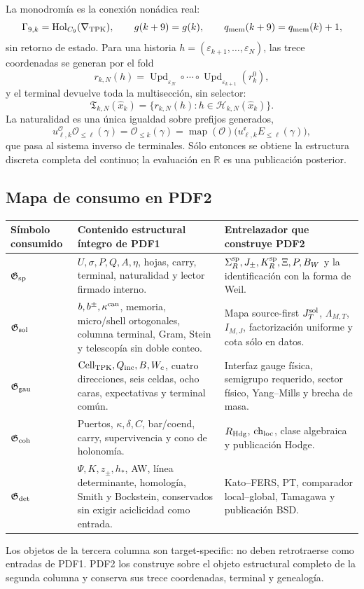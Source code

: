La monodromía es la conexión nonádica real:
\[
 \Gamma_{9,k}=\operatorname{Hol}_{C_9}(\nabla_{\rm TPK}),
 \qquad g(k+9)=g(k),
 \qquad q_{\rm mem}(k+9)=q_{\rm mem}(k)+1,
\]
sin retorno de estado. Para una historia
\(h=(\varepsilon_{k+1},\ldots,\varepsilon_N)\), las trece coordenadas se
generan por el fold
\[
 r_{k,N}(h)=
 \operatorname{Upd}_{\varepsilon_N}\circ\cdots\circ
 \operatorname{Upd}_{\varepsilon_{k+1}}(r^0_{k}),
\]
y el terminal devuelve toda la multisección, sin selector:
\[
 \mathfrak T_{k,N}(\widehat x_k)
 =\{r_{k,N}(h):h\in\mathscr H_{k,N}(\widehat x_k)\}.
\]
La naturalidad es una única igualdad sobre prefijos generados,
\[
 u_{\ell,k}^{\mathcal O}\mathcal O_{\le\ell}(\gamma)
 =\mathcal O_{\le k}(\gamma)
 =\operatorname{map}(\mathcal O)
   \bigl(u_{\ell,k}^{\mathfrak e}E_{\le\ell}(\gamma)\bigr),
\]
que pasa al sistema inverso de terminales. Sólo entonces se obtiene la
estructura discreta completa del continuo; la evaluación en \(\mathbb R\) es
una publicación posterior.

\subsection*{Mapa de consumo en PDF2}

\begin{center}
\small
\begin{tabularx}{\textwidth}{@{}p{}X p{}@{}}
\toprule
Símbolo consumido & Contenido estructural íntegro de PDF1 &
Entrelazador que construye PDF2 \\
\midrule
\(\mathfrak G_{\rm sp}\) &
\(U,\sigma,P,Q,A,\eta\), hojas, carry, terminal, naturalidad y lector
firmado interno. &
\(\Sigma_R^{\rm sp},J_\pm,K_R^{\rm sp},\Xi,P,B_W\) y la identificación
con la forma de Weil. \\
\(\mathfrak G_{\rm sol}\) &
\(b,b^\pm,\kappa^{\rm can}\), memoria, micro/shell ortogonales, columna
terminal, Gram, Stein y telescopía sin doble conteo. &
Mapa source-first \(J_T^{\rm sol}\), \(\Lambda_{M,T}\), \(I_{M,J}\),
factorización uniforme y cota sólo en datos. \\
\(\mathfrak G_{\rm gau}\) &
\(\operatorname{Cell}_{\rm TPK},Q_{\rm inc},B,W_c\), cuatro direcciones,
seis celdas, ocho caras, expectativas y terminal común. &
Interfaz gauge física, semigrupo requerido, sector físico, Yang--Mills y
brecha de masa. \\
\(\mathfrak G_{\rm coh}\) &
Puertos, \(\kappa,\delta,C\), bar/coend, carry, supervivencia y cono de
holonomía. &
\(R_{\rm Hdg}\), \(\mathrm{ch}_{\rm loc}\), clase algebraica y publicación
Hodge. \\
\(\mathfrak G_{\rm det}\) &
\(\Psi,K,z_\pm,h_*\), AW, línea determinante, homología, Smith y
Bockstein, conservados sin exigir aciclicidad como entrada. &
Kato--FERS, PT, comparador local--\newline global, Tamagawa y publicación BSD. \\
\bottomrule
\end{tabularx}
\end{center}

Los objetos de la tercera columna son target-specific: no deben retrotraerse
como entradas de PDF1. PDF2 los construye sobre el objeto estructural completo
de la segunda columna y conserva sus trece coordenadas, terminal y genealogía.
